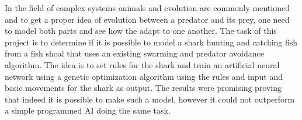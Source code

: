 In the field of complex systems animals and evolution are commonly mentioned and to get a proper idea of evolution between a predator and its prey, one need to model both parts and see how the adapt to one another. The task of this project is to determine if it is possible to model a shark hunting and catching fish from a fish shoal that uses an existing swarming and predator avoidance algorithm. The idea is to set rules for the shark and train an artificial neural network using a genetic optimization algorithm using the rules and input and basic movements for the shark as output. The results were promising proving that indeed it is possible to make such a model, however it could not outperform a simple programmed AI doing the same task.
